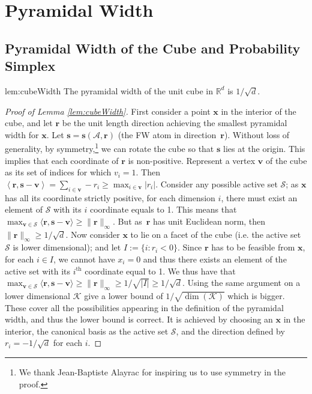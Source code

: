 \documentclass{article} %
\newcommand{\R}{\mathbb{R}}
\newcommand{\x}{\bm{x}}
\newcommand{\s}{\bm{s}}
\newcommand{\vv}{\bm{v}} %
\newcommand{\Vertices}{\mathcal{A}} %
\renewcommand{\S}{\mathcal{S}}
\renewcommand{\r}{\bm{r}}
\newcommand{\innerProd}[2]{\left\langle #1 , #2 \right\rangle}
\newcommand{\innerProdCompressed}[2]{\langle #1 , #2 \rangle}
\newcommand{\Kface}{\mathcal{K}}
\newcommand{\0}{\mathbf{0}} %
\begin{document}
%
\section{Pyramidal Width}\label{sec:pyramidal}

%
%
%
%
%
%
%
%
%
%
%
%
%
%
%
%
%
%
%
%
%
%
%
%
%
%
%
%


\subsection{Pyramidal Width of the Cube and Probability Simplex} \label{app:cubeWidth}
\begin{replemma}{lem:cubeWidth}
The pyramidal width of the unit cube in $\R^d$ is $1/\sqrt{d}$.
\end{replemma}
\begin{proof}[Proof of Lemma \ref{lem:cubeWidth}]
First consider a point $\x$ in the interior of the cube, and let $\r$ be the
unit length direction achieving the smallest pyramidal width for $\x$. Let $\s
= \s(\Vertices, \r)$ (the FW atom in direction~$\r$). Without loss of generality, 
by symmetry,\footnote{We thank Jean-Baptiste Alayrac for inspiring us
to use symmetry in the proof.} we can rotate
the cube so that $\s$ lies at the origin. This implies that each coordinate
of $\r$ is non-positive. Represent a vertex $\vv$ of the cube  as its set of
indices for which $v_i = 1$. Then $\innerProd{\r}{\s - \vv} = \sum_{i \in
\vv} -r_i \geq \max_{i \in \vv} |r_i|$. Consider any possible active set
$\S$; as $\x$ has all its coordinate strictly positive, for each dimension
$i$, there must exist an element of $\S$ with its $i$ coordinate equals to 1.
This means that $\max_{\vv \in \S} \innerProdCompressed{\r}{\s-\vv} \geq
\|\r\|_{\infty}$. But as~$\r$ has unit Euclidean norm, then
$\|\r\|_{\infty} \geq 1/\sqrt{d}$. Now consider $\x$ to lie on a facet of
the cube (i.e. the active set $\S$ is lower dimensional); and let $I := \{i :
r_i < 0 \}$. Since $\r$ has to be feasible from $\x$, for each $i \in I$, we
cannot have $x_i = 0$ and thus there exists an element of the active set with
its $i^{\text{th}}$ coordinate equal to 1. We thus have that $\max_{\vv \in
\S} \innerProdCompressed{\r}{\s-\vv} \geq \|\r\|_{\infty} \geq 1/\sqrt{|I|}
\geq 1/\sqrt{d}$. Using the same argument on a lower dimensional $\Kface$
give a lower bound of $1/\sqrt{\dim(\Kface)}$ which is bigger. These cover
all the possibilities appearing in the definition of the pyramidal width, and
thus the lower bound is correct. It is achieved by choosing an $\x$ in the
interior, the canonical basis as the active set $\S$, and the direction
defined by $r_i = -1/\sqrt{d}$ for each $i$. 
\end{proof}
\end{document}
